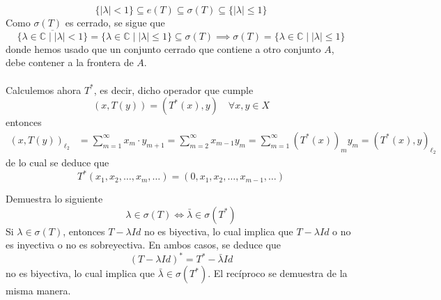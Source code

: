 \begin{ejemplo}
\begin{equation*}
        \{ |\lambda| < 1 \} \subseteq e(T) \subseteq \sigma(T) \subseteq \{ |\lambda| \leq 1 \}
    \end{equation*}
    Como $\sigma(T)$ es cerrado, se sigue que
    $$\overline{\{ \lambda \in \mathbb{C} \mid |\lambda| < 1 \}}=\{ \lambda \in \mathbb{C} \mid |\lambda| \leq 1 \} \subseteq \sigma(T)\implies\sigma(T) = \{ \lambda \in \mathbb{C} \mid |\lambda| \leq 1 \} $$
    donde hemos usado que un conjunto cerrado que contiene a otro conjunto $A$, debe contener a la frontera de $A$. \\ \\
    \noindent
    Calculemos ahora $T^*$, es decir, dicho operador que cumple
    \begin{equation*}
        ( x, T(y) ) = ( T^*(x), y ) \quad \forall x, y \in X
    \end{equation*}
    entonces
    \begin{align*}
        ( x, T(y) )_{\ell_2} &= \sum_{m=1}^{\infty} x_m \cdot y_{m+1} = \sum_{m=2}^{\infty} x_{m-1} y_m = \sum_{m=1}^{\infty} (T^*(x))_m y_m = ( T^*(x), y )_{\ell_2}
    \end{align*}
    de lo cual se deduce que
    \begin{equation*}        
        T^*(x_1, x_2, \dots, x_m, \dots) = (0, x_1, x_2, \dots, x_{m-1}, \dots)
    \end{equation*}
\end{ejemplo}

\begin{ejercicio}
    Demuestra lo siguiente
    \begin{equation*}
        \lambda \in \sigma(T) \iff \bar{\lambda} \in \sigma(T^*)
    \end{equation*}
    Si $\lambda \in \sigma(T)$, entonces $T - \lambda Id$ no es biyectiva, lo cual implica que $T - \lambda Id$ o no es inyectiva o no es sobreyectiva. En ambos casos, se deduce que 
    $$(T - \lambda Id)^*=T^*-\bar{\lambda} Id$$ 
    no es biyectiva, lo cual implica que $\bar{\lambda} \in \sigma(T^*)$. El recíproco se demuestra de la misma manera. \\
\end{ejercicio}

